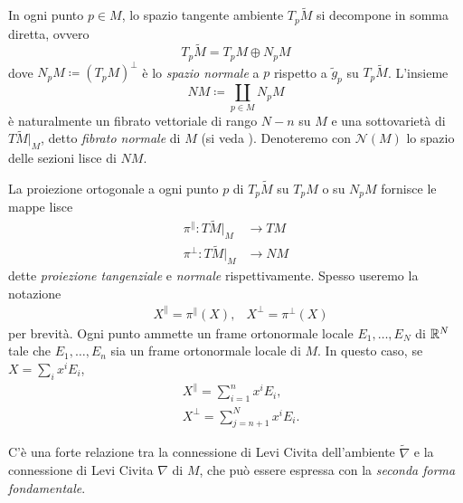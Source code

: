 	In ogni punto \(p \in M\), lo spazio tangente ambiente \(T_p\widetilde{M}\) si decompone in somma diretta, ovvero
	\[
	T_p\widetilde{M} = T_pM \oplus N_pM
	\]
	dove \(N_pM \coloneq (T_pM)^\perp\) è lo \textit{spazio normale} a \(p\) rispetto a \(\widetilde{g}_p\) su \(T_p\widetilde{M}\). L'insieme
	\[
	NM \coloneq \coprod_{p \in M}N_pM
	\]
	è naturalmente un fibrato vettoriale di rango \(N-n\) su \(M\) e una sottovarietà di \(T\widetilde{M}|_M\), detto \textit{fibrato normale} di \(M\) (si veda \cite[p. 133]{lee1997riemannian}). Denoteremo con \(\mathcal{N}(M)\) lo spazio delle sezioni lisce di \(NM\).
	
	La proiezione ortogonale a ogni punto \(p\) di \(T_p\widetilde{M}\) su \(T_pM\) o su \(N_pM\) fornisce le mappe lisce
	\begin{align*}
		\pi^\parallel : T\widetilde{M}|_M &\to TM \\
		\pi^\perp : T\widetilde{M}|_M &\to NM
	\end{align*}
	dette \textit{proiezione tangenziale} e \textit{normale} rispettivamente. Spesso useremo la notazione
	\begin{align*}
		&X^\parallel = \pi^\parallel (X), &X^\perp = \pi^\perp (X)
	\end{align*}
	per brevità. Ogni punto ammette un frame ortonormale locale \(E_1,\dots,E_N\) di \(\mathbb{R}^N\) tale che \(E_1, \dots, E_n\) sia un frame ortonormale locale di \(M\). In questo caso, se \(X = \sum_i x^iE_i\), 
		\begin{align*}
		&X^\parallel = \sum_{i=1}^n x^iE_i, \\
		&X^\perp = \sum_{j=n+1}^N x^iE_i.
	\end{align*}
	
	C'è una forte relazione tra la connessione di Levi Civita dell'ambiente \(\widetilde{\nabla}\) e la connessione di Levi Civita \(\nabla\) di \(M\), che può essere espressa con la \textit{seconda forma fondamentale}. 
	
